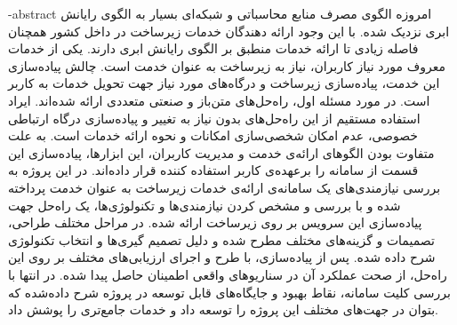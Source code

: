 
\department{}

\fa-abstract{
امروزه الگوی مصرف منابع محاسباتی و شبکه‌ای بسیار به الگوی رایانش ابری نزدیک شده. با این وجود ارائه دهندگان خدمات زیرساخت در داخل کشور همچنان فاصله زیادی تا ارائه خدمات منطبق بر الگوی رایانش ابری دارند. یکی از خدمات معروف مورد نیاز کاربران، نیاز به زیرساخت به عنوان خدمت است. چالش پیاده‌سازی این خدمت، پیاده‌سازی زیرساخت و درگاه‌های مورد نیاز جهت تحویل خدمات به کاربر است. در مورد مسئله اول، راه‌حل‌های متن‌باز و صنعتی متعددی ارائه شده‌اند. ایراد استفاده مستقیم از این راه‌حل‌های بدون نیاز به تغییر و پیاده‌سازی درگاه ارتباطی خصوصی، عدم امکان شخصی‌سازی امکانات و نحوه ارائه خدمات است. به علت متفاوت بودن الگو‌های ارائه‌ی خدمت و مدیریت کاربران، این ابزار‌ها، پیاده‌سازی این قسمت از سامانه‌ را برعهده‌ی ‌کاربر استفاده کننده قرار داده‌اند. در این پروژه به بررسی نیازمندی‌های یک سامانه‌ی ارائه‌ی خدمات زیرساخت به عنوان خدمت پرداخته شده و با بررسی و مشخص کردن نیازمندی‌ها و تکنولوژی‌ها، یک راه‌حل جهت پیاده‌سازی این سرویس بر روی زیرساخت  ارائه شده. در مراحل مختلف طراحی، تصمیمات و گزینه‌های مختلف مطرح شده و دلیل تصمیم گیری‌ها و انتخاب تکنولوژی شرح داده شده. پس از پیاده‌سازی، با طرح و اجرای ارزیابی‌های مختلف بر روی این راه‌حل، از صحت عملکرد آن در سناریو‌های واقعی اطمینان حاصل پیدا شده. در انتها با بررسی کلیت سامانه، نقاط بهبود و جایگاه‌های قابل توسعه در پروژه شرح داده‌شده که بتوان در جهت‌های مختلف این پروژه را توسعه داد و خدمات جامع‌تری را پوشش داد.
}

